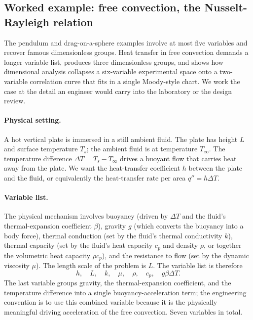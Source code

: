 \subsection{Worked example: free convection, the Nusselt-Rayleigh
relation}

The pendulum and drag-on-a-sphere examples involve at most five
variables and recover famous dimensionless groups. Heat transfer in
free convection demands a longer variable list, produces three
dimensionless groups, and shows how dimensional analysis collapses a
six-variable experimental space onto a two-variable correlation curve
that fits in a single Moody-style chart. We work the case at the
detail an engineer would carry into the laboratory or the design
review.

\paragraph{Physical setting.} A hot vertical plate is immersed in a
still ambient fluid. The plate has height $L$ and surface temperature
$T_{s}$; the ambient fluid is at temperature $T_{\infty}$. The
temperature difference $\Delta T = T_{s} - T_{\infty}$ drives a
buoyant flow that carries heat away from the plate. We want the
heat-transfer coefficient $h$ between the plate and the fluid, or
equivalently the heat-transfer rate per area $q'' = h \Delta T$.

\paragraph{Variable list.} The physical mechanism involves buoyancy
(driven by $\Delta T$ and the fluid's thermal-expansion coefficient
$\beta$), gravity $g$ (which converts the buoyancy into a body
force), thermal conduction (set by the fluid's thermal conductivity
$k$), thermal capacity (set by the fluid's heat capacity $c_{p}$ and
density $\rho$, or together the volumetric heat capacity $\rho c_{p}$),
and the resistance to flow (set by the dynamic viscosity $\mu$). The
length scale of the problem is $L$. The variable list is therefore
\[
h, \quad L, \quad k, \quad \mu, \quad \rho, \quad c_{p}, \quad
g \beta \Delta T.
\]
The last variable groups gravity, the thermal-expansion coefficient,
and the temperature difference into a single buoyancy-acceleration
term; the engineering convention is to use this combined variable
because it is the physically meaningful driving acceleration of the
free convection. Seven variables in total.

